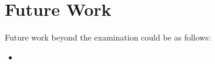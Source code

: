 
\chapter{Future Work}
Future work beyond the examination could be as follows:
\begin{itemize}
	\item 
\end{itemize}

\FloatBarrier